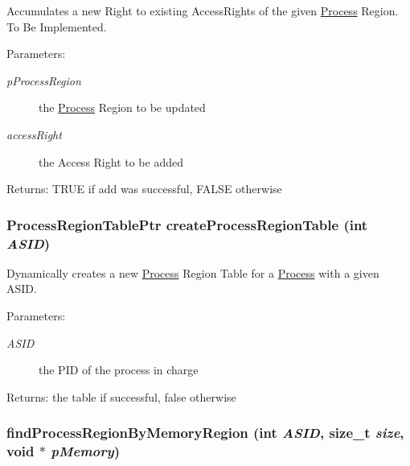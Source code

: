 Accumulates a new Right to existing AccessRights of the given \hyperlink{struct_process}{Process} Region. To Be Implemented. \begin{Desc}
\item[Parameters:]
\begin{description}
\item[{\em pProcessRegion}]the \hyperlink{struct_process}{Process} Region to be updated \item[{\em accessRight}]the Access Right to be added \end{description}
\end{Desc}
\begin{Desc}
\item[Returns:]TRUE if add was successful, FALSE otherwise \end{Desc}
\hypertarget{group___v_m_m___p_r_t_gfb393f1640529f598296f3b4ecee0874}{
\subsubsection[{createProcessRegionTable}]{\setlength{\rightskip}{0pt plus 5cm}ProcessRegionTablePtr createProcessRegionTable (int {\em ASID})}}
\label{group___v_m_m___p_r_t_gfb393f1640529f598296f3b4ecee0874}


Dynamically creates a new \hyperlink{struct_process}{Process} Region Table for a \hyperlink{struct_process}{Process} with a given ASID. \begin{Desc}
\item[Parameters:]
\begin{description}
\item[{\em ASID}]the PID of the process in charge \end{description}
\end{Desc}
\begin{Desc}
\item[Returns:]the table if successful, false otherwise \end{Desc}
\hypertarget{group___v_m_m___p_r_t_gb544170401f25a8d8400c426ccbf157c}{
\subsubsection[{findProcessRegionByMemoryRegion}]{ findProcessRegionByMemoryRegion (int {\em ASID}, \/  size\_\-t {\em size}, \/  void $\ast$ {\em pMemory})}}
\label{group___v_m_m___p_r_t_gb544170401f25a8d8400c426ccbf157c}


